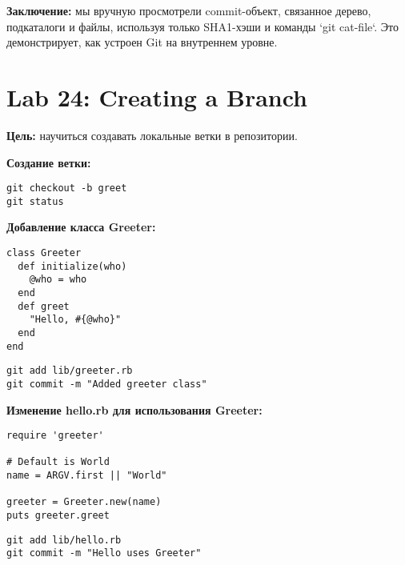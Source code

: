 \documentclass[a4paper,12pt]{report}
\begin{document}

\textbf{Заключение:} мы вручную просмотрели commit-объект, связанное дерево, подкаталоги и файлы, используя только SHA1-хэши и команды `git cat-file`. Это демонстрирует, как устроен Git на внутреннем уровне.

\section{Lab 24: Creating a Branch}

\textbf{Цель:} научиться создавать локальные ветки в репозитории.

\textbf{Создание ветки:}
\begin{verbatim}
git checkout -b greet
git status
\end{verbatim}


\textbf{Добавление класса Greeter:}
\begin{verbatim}
class Greeter
  def initialize(who)
    @who = who
  end
  def greet
    "Hello, #{@who}"
  end
end
\end{verbatim}

\begin{verbatim}
git add lib/greeter.rb
git commit -m "Added greeter class"
\end{verbatim}


\textbf{Изменение hello.rb для использования Greeter:}
\begin{verbatim}
require 'greeter'

# Default is World
name = ARGV.first || "World"

greeter = Greeter.new(name)
puts greeter.greet
\end{verbatim}

\begin{verbatim}
git add lib/hello.rb
git commit -m "Hello uses Greeter"
\end{verbatim}

\end{document}
